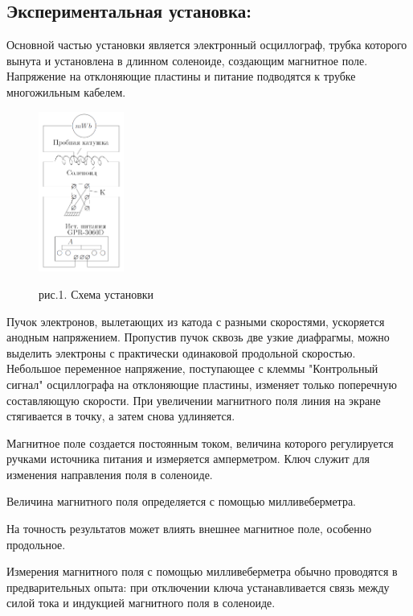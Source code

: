 \documentclass{article}
\begin{document}
\subsection* {Экспериментальная установка:}

Основной частью установки является электронный осциллограф, трубка которого вынута и установлена в длинном соленоиде, создающим магнитное поле. Напряжение на отклоняющие пластины и питание подводятся к трубке многожильным кабелем.

\begin{figure}
    \centering
    \includegraphics[width=0.25\textwidth]{images/image1.png}
    
    рис.1. Схема установки
\end{figure}

Пучок электронов, вылетающих из катода с разными скоростями, ускоряется анодным напряжением. Пропустив пучок сквозь две узкие диафрагмы, можно выделить электроны с практически одинаковой продольной скоростью. Небольшое переменное напряжение, поступающее с клеммы "Контрольный сигнал" осциллографа на отклоняющие пластины, изменяет только поперечную составляющую скорости. При увеличении магнитного поля линия на экране стягивается в точку, а затем снова удлиняется. 

Магнитное поле создается постоянным током, величина которого регулируется ручками источника питания и измеряется амперметром. Ключ служит для изменения направления поля в соленоиде.

Величина магнитного поля определяется с помощью милливеберметра.

На точность результатов может влиять внешнее магнитное поле, особенно продольное. 

Измерения магнитного поля с помощью милливеберметра обычно проводятся в предварительных опыта: при отключении ключа устанавливается связь между силой тока и индукцией магнитного поля в соленоиде. 
\end{document}
